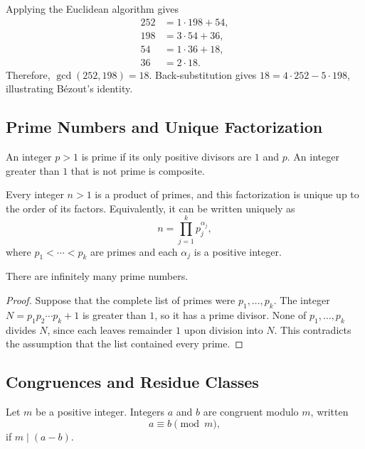 \begin{example}
Applying the Euclidean algorithm gives
\begin{align*}
252&=1\cdot198+54,\\
198&=3\cdot54+36,\\
54&=1\cdot36+18,\\
36&=2\cdot18.
\end{align*}
Therefore, $\gcd(252,198)=18$. Back-substitution gives $18=4\cdot252-5\cdot198$, illustrating Bézout's identity.
\end{example}

\subsection{Prime Numbers and Unique Factorization}

\begin{definition}
An integer $p>1$ is prime if its only positive divisors are $1$ and $p$. An integer greater than $1$ that is not prime is composite.
\end{definition}

\begin{theorem}
Every integer $n>1$ is a product of primes, and this factorization is unique up to the order of its factors. Equivalently, it can be written uniquely as
\[
 n=\prod_{j=1}^{k}p_j^{\alpha_j},
\]
where $p_1<\cdots<p_k$ are primes and each $\alpha_j$ is a positive integer.
\end{theorem}

\begin{theorem}
There are infinitely many prime numbers.
\end{theorem}

\begin{proof}
Suppose that the complete list of primes were $p_1,\ldots,p_k$. The integer $N=p_1p_2\cdots p_k+1$ is greater than $1$, so it has a prime divisor. None of $p_1,\ldots,p_k$ divides $N$, since each leaves remainder $1$ upon division into $N$. This contradicts the assumption that the list contained every prime.
\end{proof}

\subsection{Congruences and Residue Classes}

\begin{definition}[Congruence]
Let $m$ be a positive integer. Integers $a$ and $b$ are congruent modulo $m$, written
\[
 a\equiv b\pmod m,
\]
if $m\mid(a-b)$.
\end{definition}

